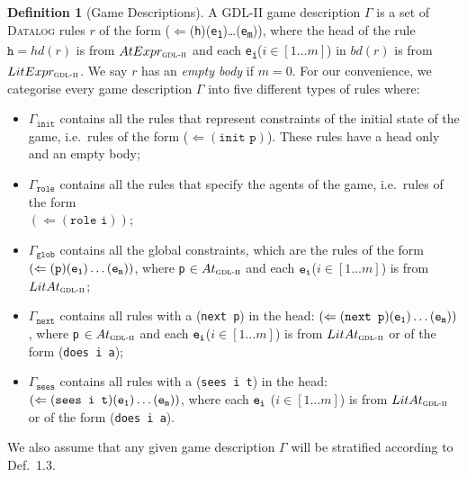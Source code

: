 \documentclass{article}
\theoremstyle{theorem}
\theoremstyle{lemma}
\theoremstyle{definition}
\newtheorem{definition}{Definition}[section]
\theoremstyle{remark}
\begin{document}
\begin{definition}[Game Descriptions]
    A GDL-II game description $\Gamma$ is a set of \textsc{Datalog} rules $r$ of the form ($\Leftarrow$(\texttt{h})(\texttt{e\textsubscript{1}})\ldots (\texttt{e\textsubscript{m}})), where the head of the rule $\texttt{h}=hd(r)$ is from $AtExpr_\textsc{gdl-ii}$ and each \texttt{e\textsubscript{i}}($i\in[1\ldots m]$) in $bd(r)$ is from $LitExpr_\textsc{gdl-ii}$. We say $r$ has an \textit{empty body} if $m=0$. For our convenience, we categorise every game description $\Gamma$ into five different types of rules where:
    \begin{itemize}
        \item $\Gamma_\texttt{init}$ contains all the rules that represent constraints of the initial state of the game, i.e.\ rules of the form ($\Leftarrow (\texttt{init p})$). These rules have a head only and an empty body;
        \item $\Gamma_\texttt{role}$ contains all the rules that specify the agents of the game, i.e.\ rules of the form \\ $(\Leftarrow(\texttt{role i}))$;
        \item $\Gamma_\texttt{glob}$ contains all the global constraints, which are the rules of the form $(\Leftarrow(\texttt{p}) (\texttt{e\textsubscript{1}}) \ldots(\texttt{e\textsubscript{m}}))$, where \texttt{p} $\in At_\textsc{gdl-ii}$ and each $\texttt{e\textsubscript{i}}$($i \in [1\ldots m]$) is from  $LitAt_\textsc{gdl-ii}$;
        \item $\Gamma_\texttt{next}$ contains all rules with a (\texttt{next p}) in the head: $(\Leftarrow(\texttt{next p}) (\texttt{e\textsubscript{1}}) \ldots (\texttt{e\textsubscript{m}}))$, where \texttt{p} $\in At_\textsc{gdl-ii}$ and each $\texttt{e\textsubscript{i}}$($i \in [1\ldots m]$) is from  $LitAt_\textsc{gdl-ii}$ or of the form (\texttt{does i a});
        \item $\Gamma_\texttt{sees}$ contains all rules with a (\texttt{sees i t}) in the head: $(\Leftarrow(\texttt{sees i t}) (\texttt{e\textsubscript{1}}) \ldots(\texttt{e\textsubscript{m}}))$, where each $\texttt{e\textsubscript{i}}$ ($i \in [1\ldots m]$) is from $LitAt_\textsc{gdl-ii}$ or of the form (\texttt{does i a}).
    \end{itemize}
\end{definition}
\par We also assume that any given game description $\Gamma$ will be stratified according to Def.~1.3.
\end{document}
